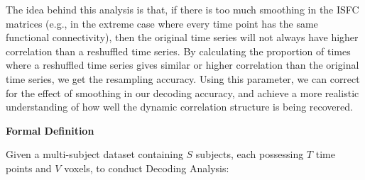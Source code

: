 \documentclass[11pt]{article}
\begin{document}
The idea behind this analysis is that, if there is too much smoothing in the ISFC matrices (e.g., in the extreme case where every time point has the same functional connectivity), then the original time series will not always have higher correlation than a reshuffled time series. By calculating the proportion of times where a reshuffled time series gives similar or higher correlation than the original time series, we get the resampling accuracy.  Using this parameter, we can correct for the effect of smoothing in our decoding accuracy, and achieve a more realistic understanding of how well the dynamic correlation structure is being recovered.

\large{\textbf{Formal Definition}}

\normalsize
Given a multi-subject dataset containing $S$ subjects, each possessing $T$ time points and $V$ voxels, to conduct Decoding Analysis:
\end{document}
